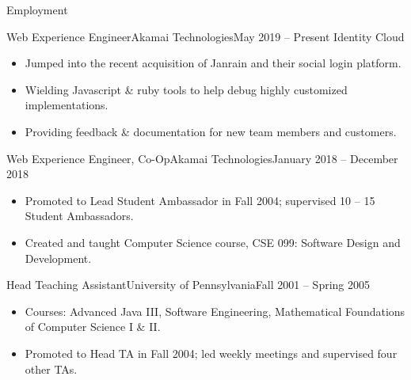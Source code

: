 \documentclass[]{mcdowellcv}
\begin{document}
	\makeheader
	
	\begin{cvsection}{Employment}
		\begin{cvsubsection}{Web Experience Engineer}{Akamai Technologies}{May 2019 -- Present}
			Identity Cloud			
			\begin{itemize}
				\item Jumped into the recent acquisition of Janrain and their social login platform.
				\item Wielding Javascript \& ruby tools to help debug highly customized implementations.
				\item Providing feedback \& documentation for new team members and customers.
			\end{itemize}
		\end{cvsubsection}
		
		\begin{cvsubsection}{Web Experience Engineer, Co-Op}{Akamai Technologies}{January 2018 -- December 2018}	
			\begin{itemize}
				\item Promoted to Lead Student Ambassador in Fall 2004; supervised 10 -- 15 Student Ambassadors.
				\item Created and taught Computer Science course, CSE 099: Software Design and Development.
			\end{itemize}
		\end{cvsubsection}
		
		\begin{cvsubsection}{Head Teaching Assistant}{University of Pennsylvania}{Fall 2001 -- Spring 2005}		
			\begin{itemize}
				\item Courses: Advanced Java III, Software Engineering, Mathematical Foundations of Computer Science I \& II.
				\item Promoted to Head TA in Fall 2004; led weekly meetings and supervised four other TAs.
			\end{itemize}
		\end{cvsubsection}
		

\end{cvsection}
\end{document}
